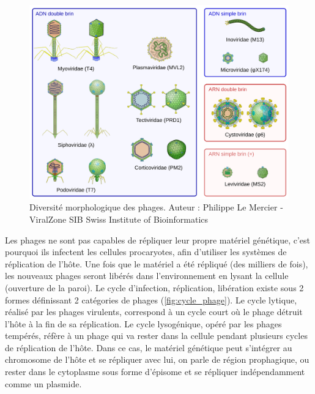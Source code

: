 \begin{figure}[htbp]
    \centering
    \includegraphics[width=0.75\linewidth]{images/phages.png}
    \caption[Diversité morphologique parmi les phages]{Diversité morphologique des phages. Auteur : Philippe Le Mercier - ViralZone SIB Swiss Institute of Bioinformatics}
    \label{fig:phages}
\end{figure}

Les phages ne sont pas capables de répliquer leur propre matériel génétique, c'est pourquoi ils infectent les cellules procaryotes, afin d'utiliser les systèmes de réplication de l'hôte. Une fois que le matériel a été répliqué (des milliers de fois), les nouveaux phages seront libérés dans l'environnement en lysant la cellule (ouverture de la paroi). Le cycle d'infection, réplication, libération existe sous 2 formes définissant 2 catégories de phages (\autoref{fig:cycle_phage}). Le cycle lytique, réalisé par les phages virulents, correspond à un cycle court où le phage détruit l'hôte à la fin de sa réplication. Le cycle lysogénique, opéré par les phages tempérés, réfère à un phage qui va rester dans la cellule pendant plusieurs cycles de réplication de l'hôte. Dans ce cas, le matériel génétique peut s'intégrer au chromosome de l'hôte et se répliquer avec lui, on parle de région prophagique, ou rester dans le cytoplasme sous forme d'épisome et se répliquer indépendamment comme un plasmide.

